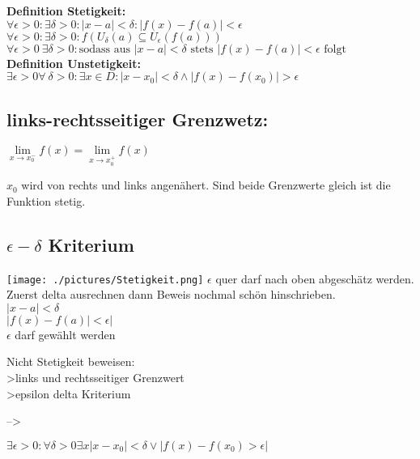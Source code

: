 
\textbf{Definition Stetigkeit:}\\
$\forall \epsilon > 0 :\exists \delta > 0 : |x-a|<\delta : |f(x)-f(a)|<\epsilon$\\
$\forall \epsilon > 0 :\exists \delta > 0 : f(U_{\delta}(a) \subseteq U_{\epsilon}(f(a)))$\\
$\forall \epsilon > 0\  \exists \delta >0 : \text{sodass aus } |x-a|<\delta \text{ stets } |f(x)-f(a)|<\epsilon \text{ folgt}$\\

\textbf{Definition Unstetigkeit:} $\exists \epsilon > 0 \forall\  \delta > 0 :\exists x \in D : |x-x_0|< \delta \wedge |f(x)-f(x_0)|>\epsilon$

\subsection{links-rechtsseitiger Grenzwetz:}

$\lim\limits_{x\to x_0^-}f(x) = \lim\limits_{x\to x_0^+} f(x)$

$x_0$ wird von rechts und links angenähert. Sind beide Grenzwerte gleich ist die Funktion stetig.


\subsection{$\epsilon - \delta$ Kriterium}

\texttt{[image: ./pictures/Stetigkeit.png]}
$\epsilon$ quer darf nach oben abgeschätz werden.
Zuerst delta ausrechnen
dann Beweis nochmal schön hinschrieben.\\

$|x-a|<\delta$\\
$|f(x)-f(a)|< \epsilon|$\\

$\epsilon$ darf gewählt werden

Nicht Stetigkeit beweisen:\\
>links und rechtsseitiger Grenzwert\\
>epsilon delta Kriterium

-->

$\exists \epsilon > 0 :\forall \delta >0 \exists x |x-x_0| < \delta \vee |f(x)-f(x_0) > \epsilon|$

